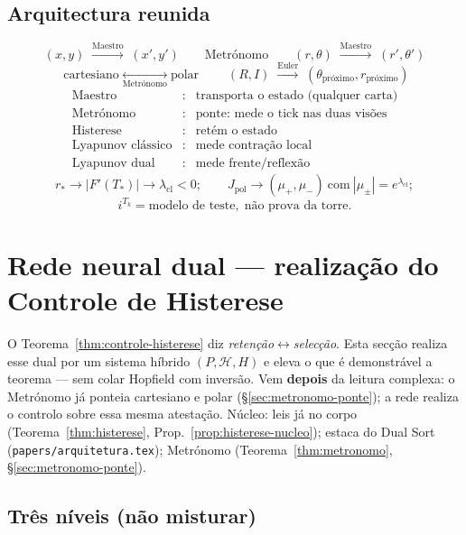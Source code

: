 \documentclass[11pt,a4paper]{article}
\newcommand{\code}[1]{\texttt{#1}}
\begin{document}
\subsection*{Arquitectura reunida}

\[
\boxed{
(x,y)
\;\xrightarrow{\text{Maestro}}\;
(x',y')
\qquad
\text{Metrónomo}
\qquad
(r,\theta)
\;\xrightarrow{\text{Maestro}}\;
(r',\theta')
}
\]
\[
\boxed{
\text{cartesiano}
\;\underset{\text{Metrónomo}}{\longleftrightarrow}\;
\text{polar}
}
\qquad
\boxed{
(R,I)
\;\overset{\text{Euler}}{\longrightarrow}\;
(\theta_{\mathrm{próximo}},r_{\mathrm{próximo}})
}
\]
\[
\boxed{
\begin{array}{rcl}
\text{Maestro} &\colon& \text{transporta o estado (qualquer carta)}\\
\text{Metrónomo} &\colon& \text{ponte: mede o tick nas duas visões}\\
\text{Histerese} &\colon& \text{retém o estado}\\
\text{Lyapunov clássico} &\colon& \text{mede contração local}\\
\text{Lyapunov dual} &\colon& \text{mede frente/reflexão}
\end{array}
}
\]
\[
\boxed{
r_{\ast}\to|F'(T_{\ast})|\to\lambda_{\mathrm{cl}}<0;
\qquad
J_{\mathrm{pol}}\to(\mu_{+},\mu_{-})\ \text{com}\ |\mu_{\pm}|=e^{\lambda_{\mathrm{cl}}};
}
\]
\[
\boxed{
i^{T_k}=\text{modelo de teste},\;\text{não prova da torre}.
}
\]

\section{Rede neural dual --- realização do Controle de Histerese}\label{sec:rede-dual}

O Teorema~\ref{thm:controle-histerese} diz \emph{retenção}$\leftrightarrow$\emph{selecção}.
Esta secção realiza esse dual por um sistema híbrido $(P,\mathcal{H},H)$
e eleva o que é demonstrável a teorema --- sem colar Hopfield com
inversão. Vem \textbf{depois} da leitura complexa: o Metrónomo já
ponteia cartesiano e polar (\S\ref{sec:metronomo-ponte}); a rede
realiza o controlo sobre essa mesma atestação. Núcleo: leis já no
corpo (Teorema~\ref{thm:histerese}, Prop.~\ref{prop:histerese-nucleo});
estaca do Dual Sort (\code{papers/arquitetura.tex}); Metrónomo
(Teorema~\ref{thm:metronomo}, \S\ref{sec:metronomo-ponte}).

\subsection*{Três níveis (não misturar)}
\end{document}
